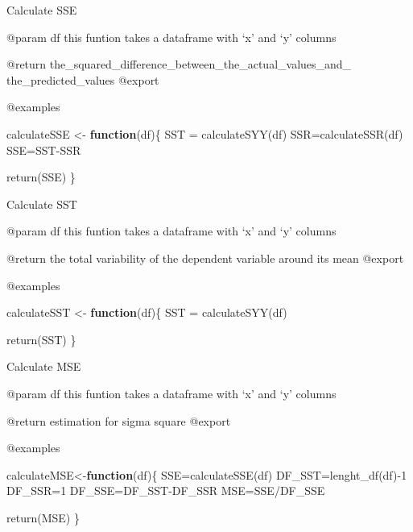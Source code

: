\documentclass[
]{article}
\newenvironment{Shaded}{\begin{snugshade}}{\end{snugshade}}
\newcommand{\ControlFlowTok}[1]{\textcolor[rgb]{0.13,0.29,0.53}{\textbf{#1}}}
\newcommand{\DecValTok}[1]{\textcolor[rgb]{0.00,0.00,0.81}{#1}}
\newcommand{\FunctionTok}[1]{\textcolor[rgb]{0.00,0.00,0.00}{#1}}
\newcommand{\NormalTok}[1]{#1}
\newcommand{\OtherTok}[1]{\textcolor[rgb]{0.56,0.35,0.01}{#1}}
\newcommand{\SpecialCharTok}[1]{\textcolor[rgb]{0.00,0.00,0.00}{#1}}
\begin{document}
Calculate SSE

@param df this funtion takes a dataframe with `x' and `y' columns

@return the\_squared\_difference\_between\_the\_actual\_values\_and\_
the\_predicted\_values @export

@examples

\begin{Shaded}
\begin{Highlighting}[]
\NormalTok{calculateSSE }\OtherTok{\textless{}{-}} \ControlFlowTok{function}\NormalTok{(df)\{}
\NormalTok{  SST }\OtherTok{=} \FunctionTok{calculateSYY}\NormalTok{(df)}
\NormalTok{  SSR}\OtherTok{=}\FunctionTok{calculateSSR}\NormalTok{(df)}
\NormalTok{  SSE}\OtherTok{=}\NormalTok{SST}\SpecialCharTok{{-}}\NormalTok{SSR}
  
  \FunctionTok{return}\NormalTok{(SSE)}
\NormalTok{\}}
\end{Highlighting}
\end{Shaded}

Calculate SST

@param df this funtion takes a dataframe with `x' and `y' columns

@return the total variability of the dependent variable around its mean
@export

@examples

\begin{Shaded}
\begin{Highlighting}[]
\NormalTok{calculateSST }\OtherTok{\textless{}{-}} \ControlFlowTok{function}\NormalTok{(df)\{}
\NormalTok{  SST }\OtherTok{=} \FunctionTok{calculateSYY}\NormalTok{(df)}
  
  \FunctionTok{return}\NormalTok{(SST)}
\NormalTok{\}}
\end{Highlighting}
\end{Shaded}

Calculate MSE

@param df this funtion takes a dataframe with `x' and `y' columns

@return estimation for sigma square @export

@examples

\begin{Shaded}
\begin{Highlighting}[]
\NormalTok{calculateMSE}\OtherTok{\textless{}{-}}\ControlFlowTok{function}\NormalTok{(df)\{}
\NormalTok{  SSE}\OtherTok{=}\FunctionTok{calculateSSE}\NormalTok{(df)}
\NormalTok{  DF\_SST}\OtherTok{=}\FunctionTok{lenght\_df}\NormalTok{(df)}\SpecialCharTok{{-}}\DecValTok{1}
\NormalTok{  DF\_SSR}\OtherTok{=}\DecValTok{1}
\NormalTok{  DF\_SSE}\OtherTok{=}\NormalTok{DF\_SST}\SpecialCharTok{{-}}\NormalTok{DF\_SSR}
\NormalTok{  MSE}\OtherTok{=}\NormalTok{SSE}\SpecialCharTok{/}\NormalTok{DF\_SSE}
  
  \FunctionTok{return}\NormalTok{(MSE)}
\NormalTok{\}}
\end{Highlighting}
\end{Shaded}
\end{document}
